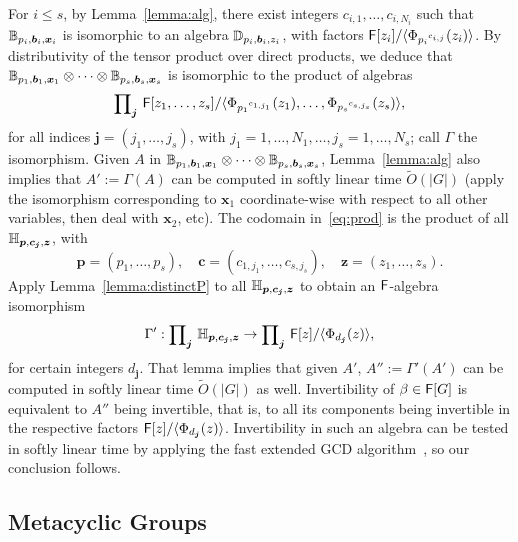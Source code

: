 For $i \le s$, by Lemma~\ref{lemma:alg}, there exist integers
$c_{i,1},\dots,c_{i,N_i}$ such that
$\mathbb{B}_{p_i,\boldsymbol{b}_i,\boldsymbol{x}_i}$ is isomorphic to an
algebra $\mathbb{D}_{p_i, \boldsymbol{b}_i, z_i}$, with factors 
${\mathsf{F}}[z_i]/\langle \Phi_{{p_i}^{c_{i,j}}}(z_i) \rangle$.
By distributivity of the tensor product over direct products, we
deduce that $\mathbb{B}_{p_1,\boldsymbol{b}_1,\boldsymbol{x}_1} \otimes \cdots
\otimes \mathbb{B}_{p_s,\boldsymbol{b}_s,\boldsymbol{x}_s}$ is isomorphic to
the product of algebras
 \begin{equation}\label{eq:prod}
\text{\small $\prod$}_{\boldsymbol{j}}~ {\mathsf{F}}[z_1,\dots,z_s]/
\langle \Phi_{{p_1}^{c_{1,j_1}}}(z_1),\dots, \Phi_{{p_s}^{c_{s,j_s}}}(z_s) \rangle,   
 \end{equation}
for all indices $\boldsymbol{j}=(j_1,\dots,j_s)$, with
$j_1 =1,\dots,N_1,\dots,j_s=1,\dots,N_s$;
call $\Gamma$ the isomorphism. Given $A$ in $\mathbb{B}_{p_1,\boldsymbol{b}_1,\boldsymbol{x}_1} \otimes
\cdots \otimes \mathbb{B}_{p_s,\boldsymbol{b}_s,\boldsymbol{x}_s}$,
Lemma~\ref{lemma:alg} also implies that $A':=\Gamma(A)$ can be
computed in softly linear time $\tilde{O}(|G|)$ (apply the isomorphism
corresponding to $\boldsymbol{x}_1$ coordinate-wise with respect to
all other variables, then deal with $\boldsymbol{x}_2$, etc).
The codomain in~\eqref{eq:prod} is the product of all $\mathbb{H}_{\boldsymbol{p},\boldsymbol{c}_{\boldsymbol{j}},\boldsymbol{z}}$,
with 
$$\boldsymbol{p}=(p_1,\dots,p_s),\quad \boldsymbol{c}=(c_{1,j_1},\dots,c_{s,j_s}),\quad \boldsymbol{z}=(z_1,\dots,z_s).$$
Apply Lemma~\ref{lemma:distinctP} to all 
$\mathbb{H}_{\boldsymbol{p},\boldsymbol{c}_{\boldsymbol{j}},\boldsymbol{z}}$ to obtain
an ${\mathsf{F}}$-algebra isomorphism
$$\Gamma': \text{\small $\prod$}_{\boldsymbol{j}}~
\mathbb{H}_{\boldsymbol{p},\boldsymbol{c}_{\boldsymbol{j}},\boldsymbol{z}} \to
\text{\small $\prod$}_{\boldsymbol{j}} ~{\mathsf{F}}[z]/\langle
\Phi_{d_{\boldsymbol{j}}}(z) \rangle,$$ for certain integers
$d_{\boldsymbol{j}}$. That lemma implies that given $A'$,
$A'':=\Gamma'(A')$ can be computed in softly linear time
$\tilde{O}(|G|)$ as well. Invertibility of $\beta \in {\mathsf{F}}[G]$ is
equivalent to $A''$ being invertible, that is, to all its components
being invertible in the respective factors ${\mathsf{F}}[z]/\langle
\Phi_{d_{\boldsymbol{j}}}(z) \rangle$. Invertibility in such an
algebra can be tested in softly linear time by applying the fast
extended GCD algorithm~\cite[Chapter~11]{vzGathen13}, so our conclusion follows.


\subsection{Metacyclic Groups}

